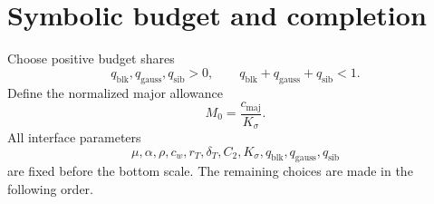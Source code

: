 \section{Symbolic budget and completion}\label{sec:completion}

Choose positive budget shares
\begin{equation}\label{eq:budget-shares}
 q_{\mathrm{blk}},q_{\mathrm{gauss}},q_{\mathrm{sib}}>0,
 \qquad
 q_{\mathrm{blk}}+q_{\mathrm{gauss}}+q_{\mathrm{sib}}<1.
\end{equation}
Define the normalized major allowance
\begin{equation}\label{eq:M0}
 M_0=\frac{c_{\mathrm{maj}}}{K_\sigma}.
\end{equation}
All interface parameters
\[
 \mu,\alpha,\rho,c_w,r_T,\delta_T,C_2,K_\sigma,
 q_{\mathrm{blk}},q_{\mathrm{gauss}},q_{\mathrm{sib}}
\]
are fixed before the bottom scale.  The remaining choices are made in the
following order.

